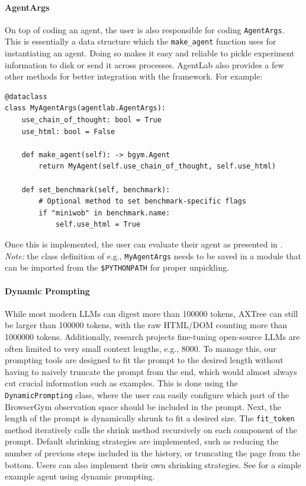\documentclass[10pt]{article} %
\newcommand{\code}[1]{\texttt{#1}}
\begin{document}
\paragraph{AgentArgs} On top of coding an agent, the user is also responsible for coding \code{AgentArgs}. This is essentially a data structure which the \code{make_agent} function uses for instantiating an agent. Doing so makes it easy and reliable to pickle experiment information to disk or send it across processes. AgentLab also provides a few other methods for better integration with the framework. For example:
\vspace{-0.5em}
\begin{verbatim}
@dataclass
class MyAgentArgs(agentlab.AgentArgs):
    use_chain_of_thought: bool = True
    use_html: bool = False
    
    def make_agent(self): -> bgym.Agent
        return MyAgent(self.use_chain_of_thought, self.use_html)
    
    def set_benchmark(self, benchmark):
        # Optional method to set benchmark-specific flags
        if "miniwob" in benchmark.name:
            self.use_html = True
\end{verbatim}
Once this is implemented, the user can evaluate their agent as presented in . \emph{Note:} the class definition of e.g., \code{MyAgentArgs} needs to be saved in a module that can be imported from the \texttt{\$PYTHONPATH} for proper unpickling.

\paragraph{Dynamic Prompting}
While most modern LLMs can digest more than \num{100000} tokens, AXTree can still be larger than \num{100000} tokens, with the raw HTML/DOM counting more than \num{1 000 000} tokens. Additionally, research projects fine-tuning open-source LLMs are often limited to very small context lengths, e.g., \num{8000}. To manage this, our prompting tools are designed to fit the prompt to the desired length without having to naively truncate the prompt from the end, which would almost always cut crucial information such as examples. This is done using the \code{DynamicPrompting} class, where the user can easily configure which part of the BrowserGym observation space should be included in the prompt. Next, the length of the prompt is dynamically shrunk to fit a desired size. The \code{fit_token} method iteratively calls the shrink method recursively on each component of the prompt. Default shrinking strategies are implemented, such as reducing the number of previous steps included in the history, or truncating the page from the bottom. Users can also implement their own shrinking strategies. See  for a simple example agent using dynamic prompting. 
\end{document}
